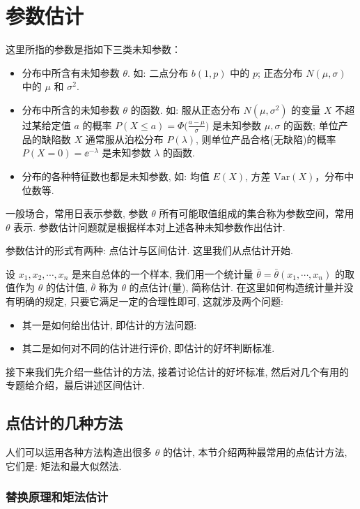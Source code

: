 \chapter{参数估计\label{cha:6}} %

这里所指的参数是指如下三类未知参数：
\begin{itemize}
\item 分布中所含有未知参数 $\theta$. 如: 二点分布 $b(1,p)$ 中的 $p$; 正态分布 $N(\mu,\sigma)$ 中的 $\mu$ 和 $\sigma^2$.
\item 分布中所含的未知参数 $\theta$ 的函数. 如: 服从正态分布 $N(\mu,\sigma^2)$ 的变量 $X$ 不超过某给定值 $a$ 的概率 $P(X\leqslant a)=\Phi\big(\frac{a-\mu}{\sigma}\big)$ 是未知参数 $\mu,\sigma$ 的函数; 单位产品的缺陷数 $X$ 通常服从泊松分布 $P(\lambda)$, 则单位产品合格(无缺陷)的概率 $P(X=0)=\ee^{-\lambda}$ 是未知参数 $\lambda$ 的函数.
\item 分布的各种特征数也都是未知参数, 如: 均值 $E(X)$, 方差 $\mathrm{Var}(X)$，分布中位数等.
\end{itemize}

一般场合，常用日表示参数, 参数 $\theta$ 所有可能取值组成的集合称为参数空间，常用 $\theta$ 表示. 参数估计问题就是根据样本对上述各种未知参数作出估计. 

参数估计的形式有两种: 点估计与区间估计. 这里我们从点估计开始.

设 $x_1,x_2,\cdots,x_n$ 是来自总体的一个样本, 我们用一个统计量 $\bar{\theta}=\bar{\theta}(x_1,\cdots,x_n)$ 的取值作为 $\theta$ 的估计值, $\bar{\theta}$ 称为 $\theta$ 的点估计(量), 简称估计. 在这里如何构造统计量并没有明确的规定, 只要它满足一定的合理性即可, 这就涉及两个问题:

\begin{itemize}
\item 其一是如何给出估计, 即估计的方法问题: 
\item 其二是如何对不同的估计进行评价, 即估计的好坏判断标准. 
\end{itemize}

接下来我们先介绍一些估计的方法, 接着讨论估计的好坏标准, 然后对几个有用的专题给介绍，最后讲述区间估计. 

\section{点估计的几种方法\label{section-6-1}} %

人们可以运用各种方法构造出很多 $\theta$ 的估计, 本节介绍两种最常用的点估计方法,它们是: 矩法和最大似然法.

\subsection{替换原理和矩法估计} %

